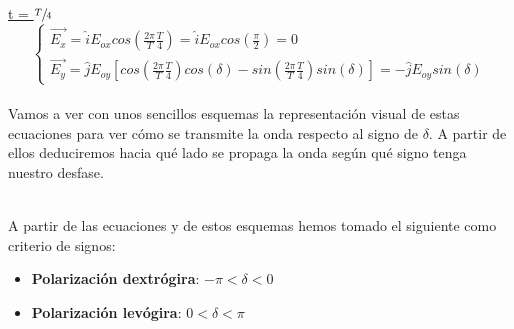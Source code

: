 \documentclass[11pt]{article}
\begin{document}
    \underline{t = $\sfrac{T}{4}$}
    \begin{equation*}
    \left\{ \begin{array}{lr} \Vec{E_x} = \hat{i}E_{ox} cos\left(\frac{2\pi}{T}\frac{T}{4}\right) = \hat{i}E_{ox} cos\left(\frac{\pi}{2}\right) = 0\\
    \Vec{E_y} = \hat{j}E_{oy}\left[cos\left(\frac{2\pi}{T}\frac{T}{4}\right)cos(\delta)-sin\left(\frac{2\pi}{T}\frac{T}{4}\right)sin(\delta)\right] = -\hat{j}E_{oy}sin(\delta)\end{array} \right.
    \end{equation*}\\

    \noindent Vamos a ver con unos sencillos esquemas la representación visual de estas ecuaciones para ver cómo se transmite la onda respecto al signo de $\delta$. A partir de ellos deduciremos hacia qué lado se propaga la onda según qué signo tenga nuestro desfase.
    \newpage
    \begin{figure}[h]
    \centering
    \hspace{2cm}
    \end{figure}\\
    
    \noindent A partir de las ecuaciones y de estos esquemas hemos tomado el siguiente como criterio de signos:\\
    
    \begin{tcolorbox}[colback=gris,colframe=azuloscuro,title=Criterio de signos respecto a las ecuaciones de onda vistas en teoría]
    \begin{itemize}
        \item \textbf{Polarización dextrógira}: $-\pi < \delta < 0$
        \item \textbf{Polarización levógira}: $0 < \delta < \pi$
    \end{itemize}
    \end{tcolorbox}\label{box:criterio teoria}
    
\end{document}
